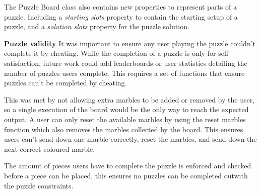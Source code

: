 \documentclass{l4proj}
\begin{document}
The Puzzle Board class also contains new properties to represent parts of a puzzle. Including a \emph{starting slots} property to contain the starting setup of a puzzle, and a \emph{solution slots} property for the puzzle solution.

\textbf{Puzzle validity}
It was important to ensure any user playing the puzzle couldn't complete it by cheating. While the completion of a puzzle is only for self satisfaction, future work could add leaderboards or user statistics detailing the number of puzzles users complete. This requires a set of functions that ensure puzzles can't be completed by cheating. 

This was met by not allowing extra marbles to be added or removed by the user, so a single execution of the board would be the only way to reach the expected output. A user can only reset the available marbles by using the reset marbles function which also removes the marbles collected by the board. This ensures users can't send down one marble correctly, reset the marbles, and send down the next correct coloured marble.

The amount of pieces users have to complete the puzzle is enforced and checked before a piece can be placed, this ensures no puzzles can be completed outwith the puzzle constraints. 


\end{document}
